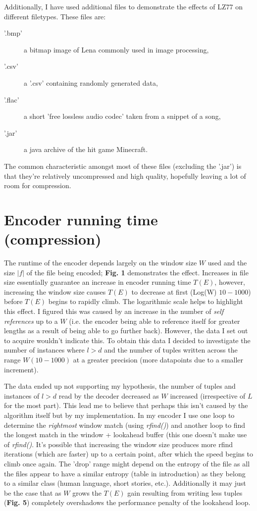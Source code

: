 \documentclass[a4paper, 10pt]{article}
\begin{document}
Additionally, I have used additional files to demonstrate the effects of LZ77 on different filetypes. These files are:
\begin{description}
\item ['.bmp'] a bitmap image of Lena commonly used in image processing,
\item ['.csv'] a '.csv' containing randomly generated data,
\item ['.flac'] a short 'free lossless audio codec' taken from a snippet of a song,
\item ['.jar'] a java archive of the hit game Minecraft.
\end{description}
The common characteristic amongst most of these files (excluding the '.jar') is that they're relatively uncompressed and high quality, hopefully leaving a lot of room for compression.

\section{Encoder running time (compression)}



The runtime of the encoder depends largely on the window size $W$ used and the size $|f|$ of the file being encoded; \textbf{Fig. 1} demonstrates the effect. Increases in file size essentially guarantee an increase in encoder running time $T(E)$, however, increasing the window size causes $T(E)$ to decrease at first (Log(W) $10-1000$) before $T(E)$ begins to rapidly climb. The logarithmic scale helps to highlight this effect. I figured this was caused by an increase in the number of \textit{self references} up to a $W$ (i.e. the encoder being able to reference itself for greater lengths as a result of being able to go further back). However, the data I set out to acquire wouldn't indicate this. To obtain this data I decided to investigate the number of instances where $l>d$ and the number of tuples written across the range $W(10-1000)$ at a greater precision (more datapoints due to a smaller increment).



The data ended up not supporting my hypothesis, the number of tuples and instances of $l>d$ read by the decoder decreased as $W$ increased (irrespective of $L$ for the most part). This lead me to believe that perhaps this isn't caused by the algorithm itself but by my implementation. In my encoder I use one loop to determine the \textit{rightmost} window match (using \textit{rfind()}) and another loop to find the longest match in the window + lookahead buffer (this one doesn't make use of \textit{rfind()}. It's possible that increasing the window size produces more rfind iterations (which are faster) up to a certain point, after which the speed begins to climb once again. The 'drop' range might depend on the entropy of the file as all the files appear to have a similar entropy (table in introduction) as they belong to a similar class (human language, short stories, etc.). Additionally it may just be the case that as $W$ grows the $T(E)$ gain resulting from writing less tuples (\textbf{Fig. 5}) completely overshadows the performance penalty of the lookahead loop.
\end{document}
